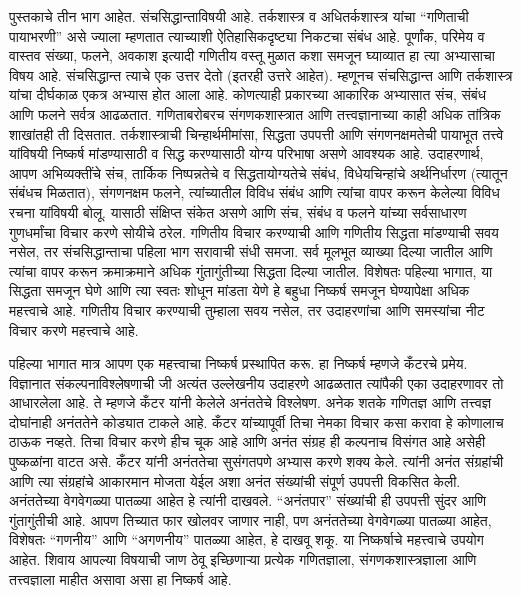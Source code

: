 पुस्तकाचे तीन भाग आहेत.  संचसिद्धान्ताविषयी आहे. तर्कशास्त्र व अधितर्कशास्त्र यांचा ``गणिताची पायाभरणी'' असे ज्याला म्हणतात त्याच्याशी ऐतिहासिकदृष्ट्या निकटचा संबंध आहे. पूर्णांक, परिमेय व वास्तव संख्या, फलने, अवकाश इत्यादी गणितीय वस्तू मुळात कशा समजून घ्याव्यात हा त्या अभ्यासाचा विषय आहे. संचसिद्धान्त त्याचे एक उत्तर देतो (इतरही उत्तरे आहेत). म्हणूनच संचसिद्धान्त आणि तर्कशास्त्र यांचा दीर्घकाळ एकत्र अभ्यास होत आला आहे. कोणत्याही प्रकारच्या आकारिक अभ्यासात संच, संबंध आणि फलने सर्वत्र आढळतात. गणिताबरोबरच संगणकशास्त्रात आणि तत्त्वज्ञानाच्या काही अधिक तांत्रिक शाखांतही ती दिसतात. तर्कशास्त्राची चिन्हार्थमीमांसा, सिद्धता उपपत्ती आणि संगणनक्षमतेची पायाभूत तत्त्वे यांविषयी निष्कर्ष मांडण्यासाठी व सिद्ध करण्यासाठी योग्य परिभाषा असणे आवश्यक आहे. उदाहरणार्थ, आपण अभिव्यक्तींचे संच, तार्किक निष्पन्नतेचे व सिद्धतायोग्यतेचे संबंध, विधेयचिन्हांचे अर्थनिर्धारण (त्यातून संबंधच मिळतात), संगणनक्षम फलने, त्यांच्यातील विविध संबंध आणि त्यांचा वापर करून केलेल्या विविध रचना यांविषयी बोलू. यासाठी संक्षिप्त संकेत असणे आणि संच, संबंध व फलने यांच्या सर्वसाधारण गुणधर्मांचा विचार करणे सोयीचे ठरेल. गणितीय विचार करण्याची आणि गणितीय सिद्धता मांडण्याची सवय नसेल, तर संचसिद्धान्ताचा पहिला भाग सरावाची संधी समजा. सर्व मूलभूत व्याख्या दिल्या जातील आणि त्यांचा वापर करून क्रमाक्रमाने अधिक गुंतागुंतीच्या सिद्धता दिल्या जातील. विशेषतः पहिल्या भागात, या सिद्धता समजून घेणे आणि त्या स्वतः शोधून मांडता येणे हे बहुधा निष्कर्ष समजून घेण्यापेक्षा अधिक महत्त्वाचे आहे. गणितीय विचार करण्याची तुम्हाला सवय नसेल, तर उदाहरणांचा आणि समस्यांचा नीट विचार करणे महत्त्वाचे आहे.

पहिल्या भागात मात्र आपण एक महत्त्वाचा निष्कर्ष प्रस्थापित करू. हा निष्कर्ष म्हणजे कँटरचे प्रमेय. विज्ञानात संकल्पनाविश्लेषणाची जी अत्यंत उल्लेखनीय उदाहरणे आढळतात त्यांपैकी एका उदाहरणावर तो आधारलेला आहे. ते म्हणजे कँटर यांनी केलेले अनंततेचे विश्लेषण. अनेक शतके गणितज्ञ आणि तत्त्वज्ञ दोघांनाही अनंततेने कोड्यात टाकले आहे. कँटर यांच्यापूर्वी तिचा नेमका विचार कसा करावा हे कोणालाच ठाऊक नव्हते. तिचा विचार करणे हीच चूक आहे आणि अनंत संग्रह ही कल्पनाच विसंगत आहे असेही पुष्कळांना वाटत असे. कँटर यांनी अनंततेचा सुसंगतपणे अभ्यास करणे शक्य केले. त्यांनी अनंत संग्रहांची आणि त्या संग्रहांचे आकारमान मोजता येईल अशा अनंत संख्यांची संपूर्ण उपपत्ती विकसित केली. अनंततेच्या वेगवेगळ्या पातळ्या आहेत हे त्यांनी दाखवले. ``अनंतपार'' संख्यांची ही उपपत्ती सुंदर आणि गुंतागुंतीची आहे. आपण तिच्यात फार खोलवर जाणार नाही, पण अनंततेच्या वेगवेगळ्या पातळ्या आहेत, विशेषतः ``गणनीय'' आणि ``अगणनीय'' पातळ्या आहेत, हे दाखवू शकू. या निष्कर्षाचे महत्त्वाचे उपयोग आहेत. शिवाय आपल्या विषयाची जाण ठेवू इच्छिणाऱ्या प्रत्येक गणितज्ञाला, संगणकशास्त्रज्ञाला आणि तत्त्वज्ञाला माहीत असावा असा हा निष्कर्ष आहे.

